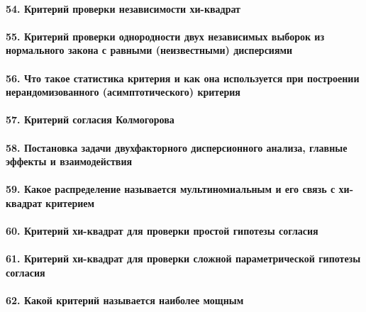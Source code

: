 \documentclass[titlepage]{article}
\begin{document}
\paragraph{54. Критерий проверки независимости хи-квадрат}

\paragraph{55. Критерий проверки однородности двух независимых выборок из нормального закона с равными (неизвестными) дисперсиями}

\paragraph{56. Что такое статистика критерия и как она используется при построении нерандомизованного (асимптотического) критерия}

\paragraph{57. Критерий согласия Колмогорова}

\paragraph{58. Постановка задачи двухфакторного дисперсионного анализа, главные эффекты и взаимодействия}

\paragraph{59. Какое распределение называется мультиномиальным и его связь с хи-квадрат критерием}

\paragraph{60. Критерий хи-квадрат для проверки простой гипотезы согласия}

\paragraph{61. Критерий хи-квадрат для проверки сложной параметрической гипотезы согласия}

\paragraph{62. Какой критерий называется наиболее мощным}
\end{document}
